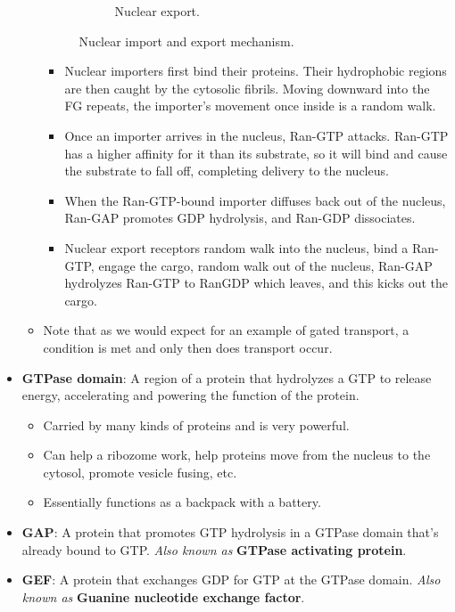 \documentclass[../notes.tex]{subfiles}
\begin{document}
\begin{itemize}
\begin{itemize}
\begin{figure}[h!]
\begin{subfigure}[b]{0.49\linewidth}
                \caption{Nuclear export.}
                \label{fig:nuclearImpExpc}
            \end{subfigure}
            \caption{Nuclear import and export mechanism.}
            \label{fig:nuclearImpExp}
        \end{figure}
        \begin{itemize}
            \item Nuclear importers first bind their proteins. Their hydrophobic regions are then caught by the cytosolic fibrils. Moving downward into the FG repeats, the importer's movement once inside is a random walk.
            \item Once an importer arrives in the nucleus, Ran-GTP attacks. Ran-GTP has a higher affinity for it than its substrate, so it will bind and cause the substrate to fall off, completing delivery to the nucleus.
            \item When the Ran-GTP-bound importer diffuses back out of the nucleus, Ran-GAP promotes GDP hydrolysis, and Ran-GDP dissociates.
            \item Nuclear export receptors random walk into the nucleus, bind a Ran-GTP, engage the cargo, random walk out of the nucleus, Ran-GAP hydrolyzes Ran-GTP to RanGDP which leaves, and this kicks out the cargo.
        \end{itemize}
        \item Note that as we would expect for an example of gated transport, a condition is met and only then does transport occur.
    \end{itemize}
    \item \textbf{GTPase domain}: A region of a protein that hydrolyzes a GTP to release energy, accelerating and powering the function of the protein.
    \begin{itemize}
        \item Carried by many kinds of proteins and is very powerful.
        \item Can help a ribozome work, help proteins move from the nucleus to the cytosol, promote vesicle fusing, etc.
        \item Essentially functions as a backpack with a battery.
    \end{itemize}
    \item \textbf{GAP}: A protein that promotes GTP hydrolysis in a GTPase domain that's already bound to GTP. \emph{Also known as} \textbf{GTPase activating protein}.
    \item \textbf{GEF}: A protein that exchanges GDP for GTP at the GTPase domain. \emph{Also known as} \textbf{Guanine nucleotide exchange factor}.

\end{itemize}
\end{document}
